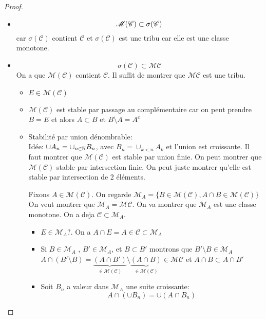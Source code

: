 \begin{proof}
	\begin{itemize}
		\item
		      $$ \mathscr{M}(\mathscr{C}) \subset \sigma(\mathscr{C}) $$
		      car $\sigma(\mathscr{C})$ contient $\mathscr{C}$ et $\sigma(\mathscr{C}) $ est une
		      tribu car elle est une classe monotone.
		\item
		      $$\sigma(\mathscr{C})  \subset \mathscr{M}\mathscr{C}$$
		      On a  que $\mathscr{M}(\mathscr{C})$ contient $\mathscr{C}$. Il
		      suffit de montrer que $\mathscr{M}\mathscr{C}$ est une tribu. \\

		      \begin{itemize}
			      \item $E \in \mathscr{M}(\mathscr{C})$
			      \item  $\mathscr{M}(\mathscr{C})$ est stable par passage au complémentaire car
			            on peut prendre $B = E$ et alors $A \subset B$ et $B\setminus A = A^c$
			      \item Stabilité par union dénombrable: \\

			            Idée: $\cup A_n = \cup_{n\in \mathbb{N}} B_n$, avec $B_n = \cup_{k<n} A_k$ et l'union est croissante.
			            Il faut montrer que $\mathscr{M}(\mathscr{C})$ est stable par union finie.
			            On peut montrer que $\mathscr{M}(\mathscr{C})$ stable par intersection finie. On peut juste montrer qu'elle est stable par intersection de 2 éléments.

			            Fixons $A \in \mathscr{M}(\mathscr{C})$. On regarde $\mathscr{M}_A = \{B \in \mathscr{M}(\mathscr{C}) , A \cap B \in \mathscr{M}(\mathscr{C})\}$
			            On veut montrer que $\mathscr{M}_A = \mathscr{M}\mathscr{C}$.
			            On va montrer que $\mathscr{M}_A$ est une classe monotone. On a deja $\mathscr{C} \subset \mathscr{M}_A$.
			            \begin{itemize}
				            \item $E \in \mathscr{M}_A ?$.  On a $A \cap E = A \in \mathscr{C} \subset \mathscr{M}_A$
				            \item Si $B \in \mathscr{M}_A$ , $B' \in \mathscr{M}_A$, et $B \subset B'$ montrons que $B'\setminus B \in \mathscr{M}_A$
				                  $A \cap (B'\setminus B) = \underbrace{(A \cap B')}_{\in   \mathscr{M}(\mathscr{C})} \setminus \underbrace{ (A\cap B)}_{\in \mathscr{M}(\mathscr{C})} \in \mathscr{M}\mathscr{C}$
				                  et $A\cap B \subset A \cap B'$
				            \item Soit $B_n$ a valeur dans $\mathscr{M}_A$ une suite croissante:
				                  $$ A \cap (\cup B_n) = \cup (A \cap B_n)$$


\end{itemize}
\end{itemize}
\end{itemize}
\end{proof}
